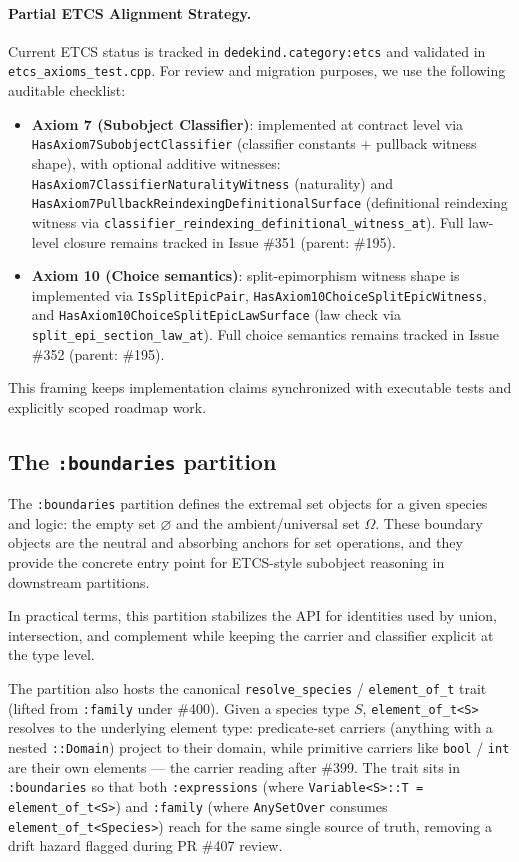 \documentclass[11pt, a4paper]{report}
\begin{document}
\paragraph{Partial ETCS Alignment Strategy.}
Current ETCS status is tracked in \texttt{dedekind.category:etcs} and validated in
\texttt{etcs\_axioms\_test.cpp}. For review and migration purposes, we use the
following auditable checklist:
\begin{itemize}
  \item \textbf{Axiom 7 (Subobject Classifier)}: implemented at contract level via
  \texttt{HasAxiom7SubobjectClassifier} (classifier constants + pullback witness shape),
  with optional additive witnesses:
  \texttt{HasAxiom7ClassifierNaturalityWitness} (naturality) and
  \texttt{HasAxiom7PullbackReindexingDefinitionalSurface} (definitional reindexing witness via \texttt{classifier\_reindexing\_definitional\_witness\_at}).
  Full law-level closure remains tracked in Issue \#351 (parent: \#195).
  \item \textbf{Axiom 10 (Choice semantics)}: split-epimorphism witness shape is
  implemented via \texttt{IsSplitEpicPair},
  \texttt{HasAxiom10ChoiceSplitEpicWitness}, and
  \texttt{HasAxiom10ChoiceSplitEpicLawSurface} (law check via \texttt{split\_epi\_section\_law\_at}).
  Full choice semantics remains tracked in Issue \#352 (parent: \#195).
\end{itemize}

This framing keeps implementation claims synchronized with executable tests and
explicitly scoped roadmap work.

\subsection{The \texttt{:boundaries} partition}

The \texttt{:boundaries} partition defines the extremal set objects for a given species and logic: the empty set $\varnothing$ and the ambient/universal set $\Omega$. These boundary objects are the neutral and absorbing anchors for set operations, and they provide the concrete entry point for ETCS-style subobject reasoning in downstream partitions.

In practical terms, this partition stabilizes the API for identities used by union, intersection, and complement while keeping the carrier and classifier explicit at the type level.

The partition also hosts the canonical \texttt{resolve\_species} / \texttt{element\_of\_t} trait (lifted from \texttt{:family} under \#400). Given a species type $S$, \texttt{element\_of\_t<S>} resolves to the underlying element type: predicate-set carriers (anything with a nested \texttt{::Domain}) project to their domain, while primitive carriers like \texttt{bool} / \texttt{int} are their own elements --- the carrier reading after \#399. The trait sits in \texttt{:boundaries} so that both \texttt{:expressions} (where \texttt{Variable<S>::T = element\_of\_t<S>}) and \texttt{:family} (where \texttt{AnySetOver} consumes \texttt{element\_of\_t<Species>}) reach for the same single source of truth, removing a drift hazard flagged during PR \#407 review.
\end{document}
